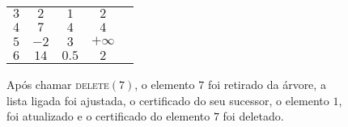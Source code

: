 \begin{figure}
\begin{tabular}{|c|c|c|c|c|}
        $3$ & $2$ & $1$ & $2$ \\

        $4$ & $7$ & $4$ & $4$ \\

        $5$ & $-2$ & $3$ & $+\infty$ \\

        $6$ & $14$ & $0.5$ & $2$ \\
        \hline
    \end{tabular}
    \caption[ABB após chamar \textsc{delete}]{Após chamar
    \textsc{delete}$(7)$, o elemento $7$ foi retirado da árvore, a
    lista ligada foi ajustada, o certificado do seu sucessor, o
    elemento $1$, foi atualizado e o certificado do elemento $7$ foi
    deletado.}
    \label{fig:abb:delete}
\end{figure}